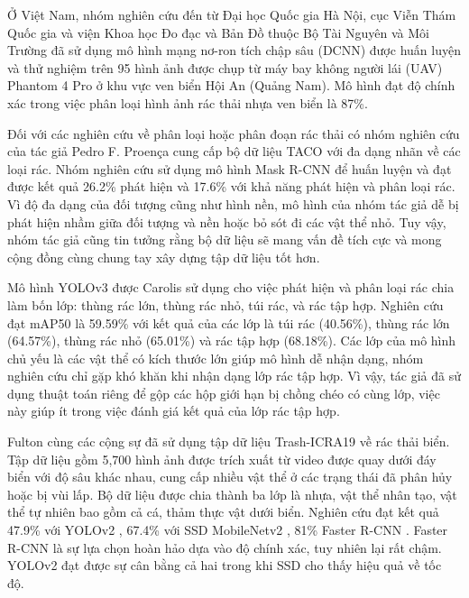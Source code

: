 \documentclass[../the.tex]{subfiles}
\begin{document}
\bigskip

{\fontsize{13}{12} \selectfont

	Ở Việt Nam, nhóm nghiên cứu đến từ Đại học Quốc gia Hà Nội, cục Viễn
	Thám Quốc gia và viện Khoa học Đo đạc và Bản Đồ thuộc Bộ Tài Nguyên và
	Môi Trường \cite{nhung2021nghien} đã sử dụng mô hình mạng nơ-ron tích chập sâu (DCNN) được
	huấn luyện và thử nghiệm trên 95 hình ảnh được chụp từ máy bay không người
	lái (UAV) Phantom 4 Pro ở khu vực ven biển Hội An (Quảng Nam). Mô hình
	đạt độ chính xác trong việc phân loại hình ảnh rác thải nhựa ven biển là 87\%.

}

\bigskip

{\fontsize{13}{12} \selectfont

	Đối với các nghiên cứu về phân loại hoặc phân đoạn rác thải có nhóm nghiên cứu của tác giả Pedro F. Proença \cite{proença2020taco} cung cấp bộ dữ liệu TACO với đa dạng nhãn về các loại rác.
	Nhóm nghiên cứu sử dụng mô hình Mask R-CNN để huấn luyện và đạt được kết quả 26.2\% phát hiện và 17.6\% với khả năng phát hiện và phân loại rác.
	Vì độ đa dạng của đối tượng cũng như hình nền, mô hình của nhóm tác giả dễ bị phát hiện nhầm giữa đối tượng và nền hoặc bỏ sót đi các vật thể nhỏ. Tuy vậy, nhóm tác giả cũng tin tưởng rằng bộ dữ liệu sẽ mang vấn đề tích cực và mong cộng đồng cùng chung tay xây dựng tập dữ liệu tốt hơn.

}

\bigskip

{\fontsize{13}{12} \selectfont

	Mô hình YOLOv3 \cite{redmon2018yolov3} được Carolis \etal \cite{9122693} sử dụng cho việc phát hiện và phân loại rác chia làm bốn lớp: thùng rác lớn, thùng rác nhỏ, túi rác, và rác tập hợp.
	Nghiên cứu đạt mAP50 là 59.59\% với kết quả của các lớp là túi rác (40.56\%), thùng rác lớn (64.57\%), thùng rác nhỏ (65.01\%) và rác tập hợp (68.18\%).
	Các lớp của mô hình chủ yếu là các vật thể có kích thước lớn giúp mô hình dễ nhận dạng, nhóm nghiên cứu chỉ gặp khó khăn khi nhận dạng lớp rác tập hợp.
	Vì vậy, tác giả đã sử dụng thuật toán riêng để gộp các hộp giới hạn bị chồng chéo có cùng lớp, việc này giúp ít trong việc đánh giá kết quả của lớp rác tập hợp.

}

\bigskip

{\fontsize{13}{12} \selectfont
	Fulton cùng các cộng sự \cite{8793975} đã sử dụng tập dữ liệu Trash-ICRA19 về rác thải biển. Tập dữ liệu gồm 5,700 hình ảnh được trích xuất từ video được quay dưới đáy biển với độ sâu khác nhau,
	cung cấp nhiều vật thể ở các trạng thái đã phân hủy hoặc bị vùi lấp.
	Bộ dữ liệu được chia thành ba lớp là nhựa, vật thể nhân tạo, vật thể tự nhiên bao gồm cả cá, thảm thực vật dưới biển.
	Nghiên cứu đạt kết quả 47.9\% với YOLOv2 \cite{redmon2016yolo9000}, 67.4\% với SSD MobileNetv2 \cite{sandler2019mobilenetv2} , 81\% Faster R-CNN \cite{ren2016faster}.
	Faster R-CNN là sự lựa chọn hoàn hảo dựa vào độ chính xác, tuy nhiên lại rất chậm. YOLOv2 đạt được sự cân bằng cả hai trong khi SSD cho thấy hiệu quả về tốc độ.

}
\end{document}
